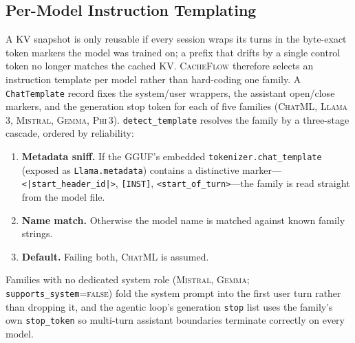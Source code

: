 \documentclass[10pt]{article}
\begin{document}
\subsection{Per-Model Instruction Templating}
\label{sec:templates}
A KV snapshot is only reusable if every session wraps its turns in the byte-exact
token markers the model was trained on; a prefix that drifts by a single control
token no longer matches the cached KV. \textsc{CacheFlow} therefore selects an
instruction template per model rather than hard-coding one family. A
\texttt{ChatTemplate} record fixes the system/user wrappers, the assistant
open/close markers, and the generation stop token for each of five families
(\textsc{ChatML}, \textsc{Llama\,3}, \textsc{Mistral}, \textsc{Gemma},
\textsc{Phi\,3}). \texttt{detect\_template} resolves the family by a three-stage
cascade, ordered by reliability:
\begin{enumerate}
  \item \textbf{Metadata sniff.} If the GGUF's embedded
  \texttt{tokenizer.chat\_template} (exposed as \texttt{Llama.metadata}) contains
  a distinctive marker---\texttt{<|start\_header\_id|>},
  \texttt{[INST]}, \texttt{<start\_of\_turn>}---the family is read straight from
  the model file.
  \item \textbf{Name match.} Otherwise the model name is matched against known
  family strings.
  \item \textbf{Default.} Failing both, \textsc{ChatML} is assumed.
\end{enumerate}
Families with no dedicated system role (\textsc{Mistral}, \textsc{Gemma};
\texttt{supports\_system}=\textsc{false}) fold the system prompt into the first
user turn rather than dropping it, and the agentic loop's generation
\texttt{stop} list uses the family's own \texttt{stop\_token} so multi-turn
assistant boundaries terminate correctly on every model.
\end{document}
